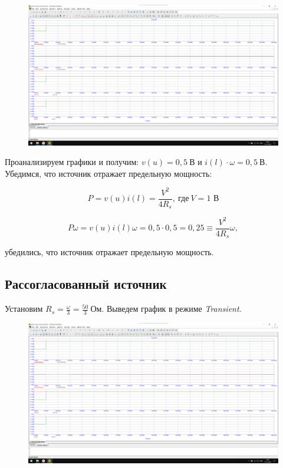\documentclass[a4paper, 12pt]{article}
\begin{document}
    \begin{figure}[H]
        \centering
        \includegraphics[width = 14 cm]{images/Graph1.png}
    \end{figure}

    Проанализируем графики и получим: $v(u) = 0,5 \: \textit{В}$ и $i(l)\cdot \omega = 0,5 \: \textit{В}$. Убедимся, что источник отражает предельную мощность:

    \[P = v(u)i(l) = \frac{V^2}{4R_s}, \: \text{где} \: V = 1\textit{ В}\]

    \[P\omega = v(u)i(l)\omega = 0,5\cdot 0,5 = 0,25 \equiv \frac{V^2}{4R_s} \omega,\]

    убедились, что источник отражает предельную мощность.

    \subsection*{Рассогласованный источник}

    Установим $R_s = \frac{\omega}{3} = \frac{50}{3} \: \textit{Ом}$. Выведем график в режиме \textit{Transient}.
    
    \begin{figure}[H]
        \centering
        \includegraphics[width = 14 cm]{images/Graph2.png}
    \end{figure}
\end{document}
